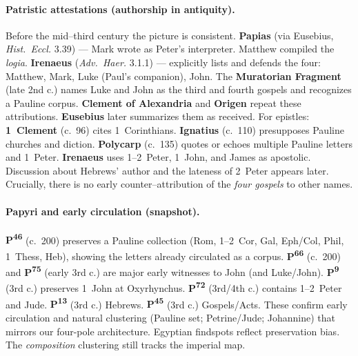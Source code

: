 \paragraph{Patristic attestations (authorship in antiquity).}
Before the mid–third century the picture is consistent.
\textbf{Papias} (via Eusebius, \textit{Hist.\ Eccl.} 3.39) — Mark wrote as Peter’s interpreter.
Matthew compiled the \textit{logia}.
\textbf{Irenaeus} (\textit{Adv.\ Haer.} 3.1.1) — explicitly lists and defends the four: Matthew, Mark, Luke (Paul’s companion), John.
The \textbf{Muratorian Fragment} (late 2nd c.) names Luke and John as the third and fourth gospels and recognizes a Pauline corpus.
\textbf{Clement of Alexandria} and \textbf{Origen} repeat these attributions.
\textbf{Eusebius} later summarizes them as received.
For epistles: \textbf{1~Clement} (c.~96) cites 1~Corinthians.
\textbf{Ignatius} (c.~110) presupposes Pauline churches and diction.
\textbf{Polycarp} (c.~135) quotes or echoes multiple Pauline letters and 1~Peter.
\textbf{Irenaeus} uses 1–2~Peter, 1~John, and James as apostolic.
Discussion about Hebrews’ author and the lateness of 2~Peter appears later.
Crucially, there is no early counter–attribution of the \emph{four gospels} to other names.

\paragraph{Papyri and early circulation (snapshot).}
\textbf{P\textsuperscript{46}} (c.~200) preserves a Pauline collection (Rom, 1–2~Cor, Gal, Eph/Col, Phil, 1~Thess, Heb), showing the letters already circulated as a corpus.
\textbf{P\textsuperscript{66}} (c.~200) and \textbf{P\textsuperscript{75}} (early 3rd c.) are major early witnesses to John (and Luke/John).
\textbf{P\textsuperscript{9}} (3rd c.) preserves 1~John at Oxyrhynchus.
\textbf{P\textsuperscript{72}} (3rd/4th c.) contains 1–2~Peter and Jude.
\textbf{P\textsuperscript{13}} (3rd c.) Hebrews.
\textbf{P\textsuperscript{45}} (3rd c.) Gospels/Acts.
These confirm early circulation and natural clustering (Pauline set; Petrine/Jude; Johannine) that mirrors our four-pole architecture.
Egyptian findspots reflect preservation bias.
The \emph{composition} clustering still tracks the imperial map.

